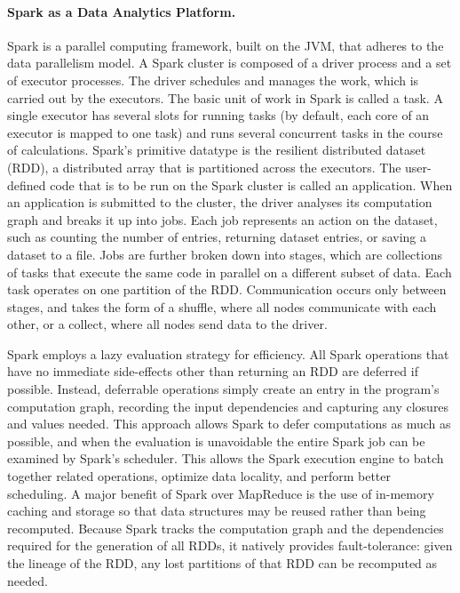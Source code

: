 
\paragraph{Spark as a Data Analytics Platform.} 
Spark is a parallel computing framework, built on the JVM, that adheres to the data parallelism model. A Spark cluster is composed of a driver process and a set of executor processes. The driver schedules and manages the work, which is carried out by the executors. The basic unit of work in Spark is called a task. A single executor has several slots for running tasks (by default, each core of an executor is mapped to one task) and runs several concurrent tasks in the course of calculations. Spark's primitive datatype is the resilient distributed dataset (RDD), a distributed array that is partitioned across the executors. The user-defined code that is to be run on the Spark cluster is called an application. When an application is submitted to the cluster, the driver analyses its computation graph and breaks it up into jobs.  Each job represents an action on the dataset, such as counting the number of entries, returning dataset entries, or saving a dataset to a file. Jobs are further broken down into stages, which are collections of tasks that execute the same code in parallel on a different subset of data. Each task operates on one partition of the RDD. Communication occurs only between stages, and takes the form of a shuffle, where all nodes communicate with each other, or a collect, where all nodes send data to the driver.

Spark employs a lazy evaluation strategy for efficiency. All Spark operations that have no immediate side-effects other than returning an RDD are deferred if possible. Instead, deferrable operations simply create an entry in the program's computation graph, recording the input dependencies and capturing any closures and values needed. This approach allows Spark to defer computations as much as possible, and when the evaluation is unavoidable the entire Spark job can be examined by Spark's scheduler. This allows the Spark execution engine to batch together related operations, optimize data locality, and perform better scheduling. A major benefit of Spark over MapReduce is the use of in-memory caching and storage so that data structures may be reused rather than being recomputed. Because Spark tracks the computation graph and the dependencies required for the generation of all RDDs, it natively provides fault-tolerance: given the lineage of the RDD, any lost partitions of that RDD can be recomputed as needed.

